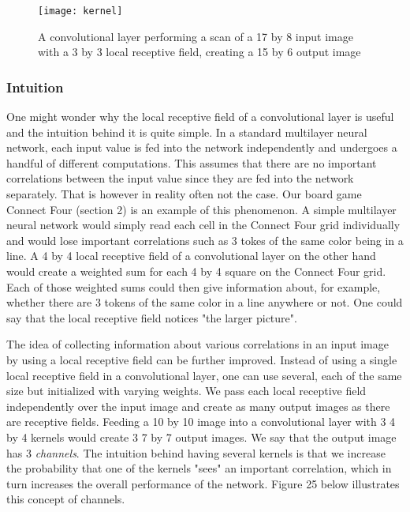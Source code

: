 \documentclass[titlepage]{article}
\begin{document}
\vskip 0.3cm

\begin{figure}[h]
    \center
    \texttt{[image: kernel]}
    \vskip 0.2cm
    \caption{A convolutional layer performing a scan of a 17 by 8 input image with a 3 by 3 local receptive field, creating a 15 by 6 output image}
\end{figure}

\newpage

\subsubsection{Intuition}

\vskip 0.2cm

One might wonder why the local receptive field of a convolutional layer is useful and the intuition behind it is quite simple. In a standard multilayer neural network, each input value is fed into the network independently and undergoes a handful of different computations. This assumes that there are no important correlations between the input value since they are fed into the network separately. That is however in reality often not the case. Our board game Connect Four (section 2) is an example of this phenomenon. A simple multilayer neural network would simply read each cell in the Connect Four grid individually and would lose important correlations such as 3 tokes of the same color being in a line. A 4 by 4 local receptive field of a convolutional layer on the other hand would create a weighted sum for each 4 by 4 square on the Connect Four grid. Each of those weighted sums could then give information about, for example, whether there are 3 tokens of the same color in a line anywhere or not. One could say that the local receptive field notices "the larger picture". 

\vskip 0.2cm

\noindent
The idea of collecting information about various correlations in an input image by using a local receptive field can be further improved. Instead of using a single local receptive field in a convolutional layer, one can use several, each of the same size but initialized with varying weights. We pass each local receptive field independently over the input image and create as many output images as there are receptive fields. Feeding a 10 by 10 image into a convolutional layer with 3 4 by 4 kernels would create 3 7 by 7 output images. We say that the output image has 3 \emph{channels}. The intuition behind having several kernels is that we increase the probability that one of the kernels "sees" an important correlation, which in turn increases the overall performance of the network. Figure 25 below illustrates this concept of channels.
\end{document}
